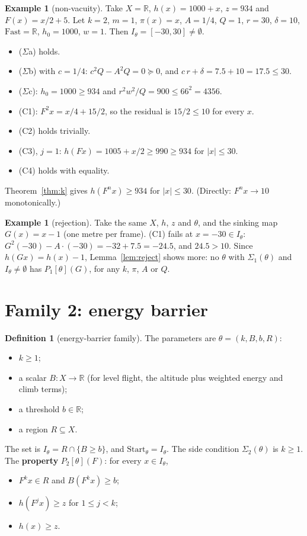 \documentclass[11pt]{article}
\theoremstyle{definition}
\newtheorem{definition}[theorem]{Definition}
\newtheorem{example}[theorem]{Example}
\newcommand{\R}{\mathbb{R}}
\newcommand{\Fast}{\ensuremath{\mathrm{Fast}}}
\newcommand{\Start}{\ensuremath{\mathrm{Start}}}
\begin{document}
\begin{example}[non-vacuity]\label{ex:k}
Take $X = \R$, $h(x) = 1000 + x$, $z = 934$ and $F(x) = x/2 + 5$. Let $k = 2$, $m = 1$, $\pi(x) = x$, $A = 1/4$, $Q = 1$, $r = 30$, $\delta = 10$, $\Fast = \R$, $h_0 = 1000$, $w = 1$. Then $I_\theta = [-30, 30] \ne \emptyset$.
\begin{itemize}
\item ($\Sigma$a) holds.
\item ($\Sigma$b) with $c = 1/4$: $c^2 Q - A^2 Q = 0 \succeq 0$, and $c\,r + \delta = 7.5 + 10 = 17.5 \le 30$.
\item ($\Sigma$c): $h_0 = 1000 \ge 934$ and $r^2 w^2/Q = 900 \le 66^2 = 4356$.
\item (C1): $F^2 x = x/4 + 15/2$, so the residual is $15/2 \le 10$ for every $x$.
\item (C2) holds trivially.
\item (C3), $j = 1$: $h(F x) = 1005 + x/2 \ge 990 \ge 934$ for $|x| \le 30$.
\item (C4) holds with equality.
\end{itemize}
Theorem~\ref{thm:k} gives $h(F^n x) \ge 934$ for $|x| \le 30$. (Directly: $F^n x \to 10$ monotonically.)
\end{example}

\begin{example}[rejection]\label{ex:knot}
Take the same $X$, $h$, $z$ and $\theta$, and the sinking map $G(x) = x - 1$ (one metre per frame). (C1) fails at $x = -30 \in I_\theta$: $G^2(-30) - A\cdot(-30) = -32 + 7.5 = -24.5$, and $24.5 > 10$. Since $h(G x) = h(x) - 1$, Lemma~\ref{lem:reject} shows more: no $\theta$ with $\Sigma_1(\theta)$ and $I_\theta \ne \emptyset$ has $P_1[\theta](G)$, for any $k$, $\pi$, $A$ or $Q$.
\end{example}

\section{Family 2: energy barrier}\label{sec:barrier}

\begin{definition}[energy-barrier family]\label{def:barrier}
The parameters are $\theta = (k, B, b, R)$:
\begin{itemize}
\item $k \ge 1$;
\item a scalar $B : X \to \R$ (for level flight, the altitude plus weighted energy and climb terms);
\item a threshold $b \in \R$;
\item a region $R \subseteq X$.
\end{itemize}
The set is $I_\theta = R \cap \{B \ge b\}$, and $\Start_\theta = I_\theta$. The side condition $\Sigma_2(\theta)$ is $k \ge 1$. The \textbf{property} $P_2[\theta](F)$: for every $x \in I_\theta$,
\begin{itemize}
\item[(B1)] $F^k x \in R$ and $B(F^k x) \ge b$;
\item[(B2)] $h(F^j x) \ge z$ for $1 \le j < k$;
\item[(B3)] $h(x) \ge z$.
\end{itemize}
\end{definition}
\end{document}
